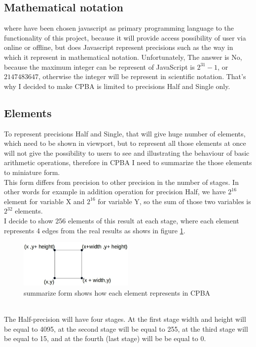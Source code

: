 \documentclass[11pt]{article}
\begin{document}
\subsection{Mathematical notation}
where have been chosen javascript as primary programming language to the functionality of this project, because it will provide access possibility of user via online or offline, but does Javascript represent precisions such as the way in which it represent in mathematical notation. Unfortunately, The answer is No, because the maximum integer can be represent of JavaScript is $2^{31} -1$, or $2147483647$, otherwise the integer will be represent in scientific notation. That's why I decided to make CPBA is limited to precisions Half and Single only.
\subsection{Elements}
To represent precisions Half and Single, that will give huge number of elements, which need to be shown in viewport, but to represent all those elements at once will not give the possibility to users to see and illustrating the behaviour of basic arithmetic operations, therefore in CPBA I need to summarize the those elements to miniature form.\\
This form differs from precision to other precision in the number of stages. In other words for example in addition operation for precision Half, we have $2^{16}$ element for variable X and $2^{16}$ for variable Y, so the sum of those two variables is $2^{32}$ elements.\\
I decide to show 256 elements of this result at each stage, where each element represents 4 edges from the real results as shows in figure \ref{edges}.\\
\begin{figure}[h]
    \centering
    \includegraphics[width=0.5\textwidth]{edges}
    \caption{summarize form shows how each element represents in CPBA}
    \label{edges}
\end{figure}\\
The Half-precision will have four stages. At the first stage width and height will be equal to 4095, at the second stage will be equal to 255, at the third stage will be equal to 15,  and at the fourth (last stage) will be be equal to 0.\\\\
\end{document}
